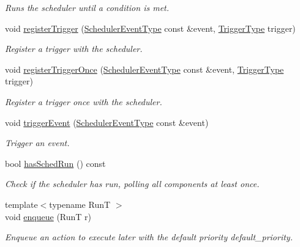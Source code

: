 \begin{DoxyCompactItemize}
\begin{DoxyCompactList}\small\item\em Runs the scheduler until a condition is met. \end{DoxyCompactList}\item 
void \hyperlink{structvt_1_1sched_1_1_scheduler_a818711c413c1ff0e843fffa877c52c78}{register\+Trigger} (\hyperlink{namespacevt_1_1sched_a54756ec39b60951d6765fcfa692d1616}{Scheduler\+Event\+Type} const \&event, \hyperlink{structvt_1_1sched_1_1_scheduler_aa0c06d6e1c31a5f1c3db474036ad7d29}{Trigger\+Type} trigger)
\begin{DoxyCompactList}\small\item\em Register a trigger with the scheduler. \end{DoxyCompactList}\item 
void \hyperlink{structvt_1_1sched_1_1_scheduler_ac6faee91832e52305c2e6ab28e1b3040}{register\+Trigger\+Once} (\hyperlink{namespacevt_1_1sched_a54756ec39b60951d6765fcfa692d1616}{Scheduler\+Event\+Type} const \&event, \hyperlink{structvt_1_1sched_1_1_scheduler_aa0c06d6e1c31a5f1c3db474036ad7d29}{Trigger\+Type} trigger)
\begin{DoxyCompactList}\small\item\em Register a trigger once with the scheduler. \end{DoxyCompactList}\item 
void \hyperlink{structvt_1_1sched_1_1_scheduler_a1bbc574a084b361bf0c88d24882ef08b}{trigger\+Event} (\hyperlink{namespacevt_1_1sched_a54756ec39b60951d6765fcfa692d1616}{Scheduler\+Event\+Type} const \&event)
\begin{DoxyCompactList}\small\item\em Trigger an event. \end{DoxyCompactList}\item 
bool \hyperlink{structvt_1_1sched_1_1_scheduler_ac7a9512a4a616d51915d5dfee84ff986}{has\+Sched\+Run} () const
\begin{DoxyCompactList}\small\item\em Check if the scheduler has run, polling all components at least once. \end{DoxyCompactList}\item 
{\footnotesize template$<$typename RunT $>$ }\\void \hyperlink{structvt_1_1sched_1_1_scheduler_a768062132bfdc473b84722a3d51c26f3}{enqueue} (RunT r)
\begin{DoxyCompactList}\small\item\em Enqueue an action to execute later with the default priority {\ttfamily default\+\_\+priority}. \end{DoxyCompactList}\item 

\end{DoxyCompactItemize}
